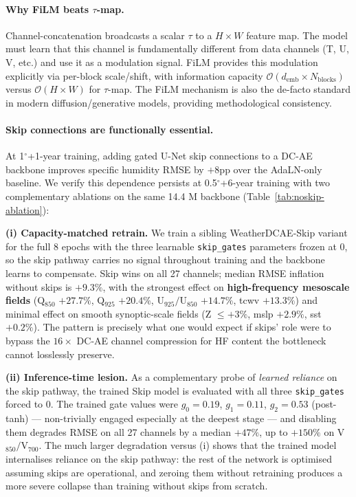 \documentclass[10pt,letterpaper,twocolumn]{article}
\begin{document}
\paragraph{Why FiLM beats $\tau$-map.}
Channel-concatenation broadcasts a scalar $\tau$ to a $H \times W$ feature map.
The model must learn that this channel is fundamentally different from
data channels (T, U, V, etc.) and use it as a modulation signal. FiLM
provides this modulation explicitly via per-block scale/shift, with
information capacity $\mathcal{O}(d_\text{emb} \times N_\text{blocks})$ versus
$\mathcal{O}(H \times W)$ for $\tau$-map. The FiLM mechanism is also the
de-facto standard in modern diffusion/generative models, providing
methodological consistency.

\paragraph{Skip connections are functionally essential.}
At 1$^\circ$+1-year training, adding gated U-Net skip connections to a
DC-AE backbone improves specific humidity RMSE by $+8$pp over the
AdaLN-only baseline. We verify this dependence persists at
0.5$^\circ$+6-year training with two complementary ablations on the
same 14.4 M backbone (Table~\ref{tab:noskip-ablation}):

\textbf{(i) Capacity-matched retrain.} We train a sibling WeatherDCAE-Skip
variant for the full 8 epochs with the three learnable
\texttt{skip\_gates} parameters frozen at 0, so the skip pathway
carries no signal throughout training and the backbone learns to
compensate. Skip wins on all 27 channels; median RMSE inflation
without skips is $+9.3\%$, with the strongest effect on
\textbf{high-frequency mesoscale fields} (Q$_{850}$ $+27.7\%$,
Q$_{925}$ $+20.4\%$, U$_{925}/$U$_{850}$ $+14.7\%$, tcwv $+13.3\%$)
and minimal effect on smooth synoptic-scale fields (Z $\leq +3\%$,
mslp $+2.9\%$, sst $+0.2\%$). The pattern is precisely what one
would expect if skips' role were to bypass the
$16\times$ DC-AE channel compression for HF content the bottleneck
cannot losslessly preserve.

\textbf{(ii) Inference-time lesion.} As a complementary probe of
\emph{learned reliance} on the skip pathway, the trained Skip model
is evaluated with all three \texttt{skip\_gates} forced to $0$. The
trained gate values were $g_0 = 0.19$, $g_1 = 0.11$, $g_2 = 0.53$
(post-tanh) --- non-trivially engaged especially at the deepest
stage --- and disabling them degrades RMSE on all 27 channels by a
median $+47\%$, up to $+150\%$ on V$_{850}/$V$_{700}$. The much
larger degradation versus (i) shows that the trained model
internalises reliance on the skip pathway: the rest of the network
is optimised assuming skips are operational, and zeroing them
without retraining produces a more severe collapse than training
without skips from scratch.
\end{document}
